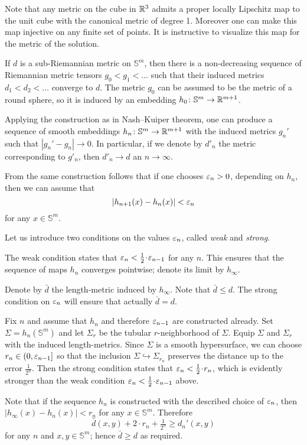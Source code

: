 Note that any metric on the cube in $\mathbb{R}^3$ admits a proper locally Lipschitz map to the unit cube with the canonical metric of degree 1.
Moreover one can make this map injective on any finite set of points.
It is instructive to visualize this map for the metric of the solution.

If $d$ is a sub-Riemannian metric on $\mathbb{S}^m$,
then there is a non-decreasing sequence of Riemannian metric tensors
$g_0< g_1<\dots$ such that their induced metrics $d_1<d_2<\dots$ converge to $d$.
The metric $g_0$ can be assumed to be the metric of a round sphere,
so it is induced by an embedding $h_0\colon\mathbb{S}^m\to \mathbb{R}^{m+1}$.

Applying the construction as in Nash--Kuiper theorem,
one can produce a sequence of smooth embeddings $h_n\colon\mathbb{S}^m\to \mathbb{R}^{m+1}$ with the induced metrics $g_n'$
such that $|g_n'-g_n|\to 0$.
In particular, if we denote by $d'_n$ the metric corresponding to $g'_n$, then $d'_n\to d$ an $n\to\infty$.

From the same construction follows that
if one chooses $\varepsilon_n>0$, depending on $h_n$,
then we can assume that 
\[|h_{n+1}(x)-h_n(x)|<\varepsilon_n\] for any $x\in \mathbb{S}^m$.

Let us introduce two conditions on the values $\varepsilon_n$, called \emph{weak} and \emph{strong}.

The weak condition states that $\eps_{n}< \tfrac1{2}\cdot \eps_{n-1}$ for any $n$.
This ensures that the sequence of maps $h_n$ converges pointwise;
denote its limit by $h_\infty$.

Denote by $\bar d$ the length-metric induced by $h_\infty$.
Note that $\bar d\le d$.
The strong condition on $\varepsilon_n$ will ensure that actually $\bar d=d$.

Fix $n$ and assume that $h_n$ and therefore $\varepsilon_{n-1}$ are constructed already.
Set $\Sigma=h_n(\mathbb{S}^m)$
and let $\Sigma_r$ be the tubular $r$-neighborhood of $\Sigma$.
Equip $\Sigma$ and $\Sigma_r$ with the induced length-metrics.
Since $\Sigma$ is a smooth hypersurface, we can choose $r_n\in(0,\varepsilon_{n-1}]$ 
so that the inclusion $\Sigma\hookrightarrow \Sigma_{r_n}$ preserves the distance up to the error $\tfrac1{2^n}$.
Then the strong condition states that $\eps_n< \tfrac12\cdot r_n$, 
which is evidently stronger than the weak condition  $\eps_{n}< \tfrac1{2}\cdot \eps_{n-1}$ above.

Note that if the sequence $h_n$ is constructed with the described choice of $\varepsilon_n$,
then $|h_\infty(x)-h_n(x)|<r_n$ for any $x\in\mathbb{S}^m$.
Therefore 
\[\bar d(x,y)+2\cdot r_n+\tfrac1{2^n}\ge d_n'(x,y)\] 
for any $n$ and $x,y\in \mathbb{S}^m$;
hence $\bar d\ge d$ as required. 
\qeds


